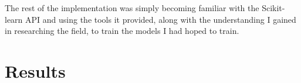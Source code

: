 \documentclass[a4paper, 12pt]{article}
\begin{document}
        \par The rest of the implementation was simply becoming familiar with the Scikit-learn API and using the tools it provided, along with the understanding I gained in researching the field, to train the models I had hoped to train.
        
    \section{Results}

                
          
    \printbibliography
\end{document}
